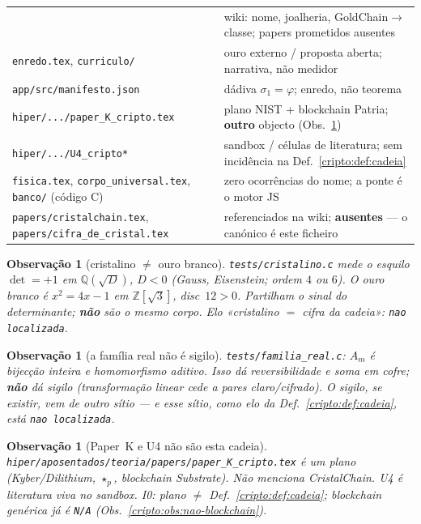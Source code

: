 \documentclass[11pt,a4paper]{article}
\newcommand{\code}[1]{\texttt{\small #1}}
\newtheorem{observacao}[teorema]{Observação}
\begin{document}
\begin{center}
\begin{tabular}{@{}p{}p{}@{}}
  & wiki: nome, joalheria, GoldChain$\to$classe; papers prometidos ausentes \\
\code{enredo.tex}, \code{curriculo/}
  & ouro externo / proposta aberta; narrativa, não medidor \\
\code{app/src/manifesto.json}
  & dádiva $\sigma_1=\varphi$; enredo, não teorema \\
\code{hiper/.../paper\_K\_cripto.tex}
  & plano NIST + blockchain Patria; \textbf{outro} objecto
    (Obs.~\ref{cripto:obs:paper-k}) \\
\code{hiper/.../U4\_cripto*}
  & sandbox / células de literatura; sem incidência na Def.~\ref{cripto:def:cadeia} \\
\code{fisica.tex}, \code{corpo\_universal.tex},
\code{banco/} (código C)
  & zero ocorrências do nome; a ponte é o motor JS \\
\code{papers/cristalchain.tex},
\code{papers/cifra\_de\_cristal.tex}
  & referenciados na wiki; \textbf{ausentes} --- o canónico é este ficheiro \\
\bottomrule
\end{tabular}
\end{center}

\begin{observacao}[cristalino $\neq$ ouro branco]\label{cripto:obs:cristalino}
\code{tests/cristalino.c} mede o esquilo $\det=+1$ em $\mathbb{Q}(\sqrt D)$, $D<0$
(Gauss, Eisenstein; ordem $4$ ou $6$).
O ouro branco é $x^{2}=4x-1$ em $\mathbb{Z}[\sqrt3]$, disc~$12>0$.
Partilham o sinal do determinante; \textbf{não} são o mesmo corpo.
Elo «cristalino $=$ cifra da cadeia»: \texttt{nao localizada}.
\end{observacao}

\begin{observacao}[a família real não é sigilo]\label{cripto:obs:familia-real}
\code{tests/familia\_real.c}: $A_m$ é bijecção inteira e homomorfismo aditivo.
Isso dá reversibilidade e soma em cofre; \textbf{não} dá sigilo
(transformação linear cede a pares claro/cifrado).
O sigilo, se existir, vem de outro sítio --- e esse sítio,
como elo da Def.~\ref{cripto:def:cadeia}, está
\texttt{nao localizada}.
\end{observacao}

\begin{observacao}[Paper~K e U4 não são esta cadeia]\label{cripto:obs:paper-k}
\code{hiper/aposentados/teoria/papers/paper\_K\_cripto.tex}
é um plano (Kyber/Dilithium, $\star_p$, blockchain Substrate).
Não menciona CristalChain.
U4 é literatura viva no sandbox.
I0: plano $\neq$ Def.~\ref{cripto:def:cadeia};
blockchain genérica já é \texttt{N/A}
(Obs.~\ref{cripto:obs:nao-blockchain}).
\end{observacao}
\end{document}
